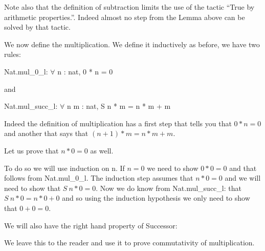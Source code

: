   Note also that the definition of subtraction limits the use of the tactic ``True by arithmetic properties.''. Indeed almost no step from the Lemma above can be solved by that tactic.
  
  
  We now define the multiplication.  We define it inductively as before, we have two rules:
 
  Nat.mul\_0\_l: $\forall$ n : nat, 0 * n = 0
  
  and
  
  Nat.mul\_succ\_l: $\forall$ n m : nat, S n * m = n * m + m
 
 
 Indeed the definition of multiplication has a first step that tells you that $0*n=0$ and another that says that $(n+1)*m = n*m+m$.
 
 Let us prove that $n*0=0$ as well.
 
 
 To do so we will use induction on n. If $n=0$ we need to show $0*0=0$ and that follows from  Nat.mul\_0\_l. The induction step assumes that $n*0=0$ and we will need to show that $S\ n * 0=0$. Now we do know from   Nat.mul\_succ\_l:  that $S\ n * 0 = n*0 +0$ and so using the induction hypothesis we only need to show that $0+0=0$.
 


We will also have the right hand  property of Successor:


We leave this to the reader and use it to prove commutativity of multiplication.





